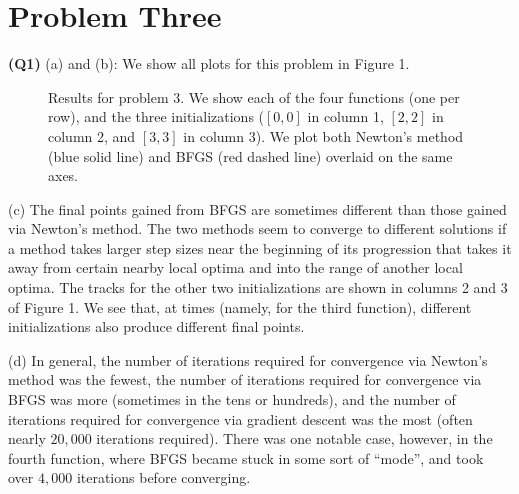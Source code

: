 

\section*{Problem Three}

\textbf{(Q1)}
(a) and (b): We show all plots for this problem in Figure 1.
\begin{figure}[h!tbp]
        \caption{Results for problem 3. We show each of the four functions (one
        per row), and the three initializations ($[0,0]$ in column 1, $[2,2]$
        in column 2, and $[3,3]$ in column 3). We plot both Newton's method
        (blue solid line) and BFGS (red dashed line) overlaid on the same
        axes.}
\end{figure}

(c) The final points gained from BFGS are sometimes different than those gained
via Newton's method. The two methods seem to converge to different solutions if
a method takes larger step sizes near the beginning of its progression that
takes it away from certain nearby local optima and into the range of another
local optima. The tracks for the other two initializations are shown in columns
2 and 3 of Figure 1. We see that, at times (namely, for the third function),
different initializations also produce different final points.

(d) In general, the number of iterations required for convergence via Newton's
method was the fewest, the number of iterations required for convergence via
BFGS was more (sometimes in the tens or hundreds), and the number of iterations
required for convergence via gradient descent was the most (often nearly
$20,000$ iterations required). There was one notable case, however, in the
fourth function, where BFGS became stuck in some sort of ``mode'', and took
over $4,000$ iterations before converging.

